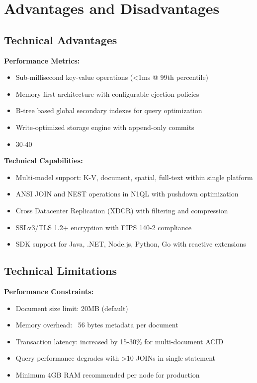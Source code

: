 \chapter{Advantages and Disadvantages}

\section{Technical Advantages}

\textbf{Performance Metrics:}
\begin{itemize}
  \item Sub-millisecond key-value operations (<1ms @ 99th percentile)
  \item Memory-first architecture with configurable ejection policies
  \item B-tree based global secondary indexes for query optimization
  \item Write-optimized storage engine with append-only commits
  \item 30-40%
\end{itemize}

\textbf{Technical Capabilities:}
\begin{itemize}
  \item Multi-model support: K-V, document, spatial, full-text within single platform
  \item ANSI JOIN and NEST operations in N1QL with pushdown optimization
  \item Cross Datacenter Replication (XDCR) with filtering and compression
  \item SSLv3/TLS 1.2+ encryption with FIPS 140-2 compliance
  \item SDK support for Java, .NET, Node.js, Python, Go with reactive extensions
\end{itemize}

\section{Technical Limitations}

\textbf{Performance Constraints:}
\begin{itemize}
  \item Document size limit: 20MB (default)
  \item Memory overhead: ~56 bytes metadata per document
  \item Transaction latency: increased by 15-30\% for multi-document ACID
  \item Query performance degrades with >10 JOINs in single statement
  \item Minimum 4GB RAM recommended per node for production
\end{itemize}

